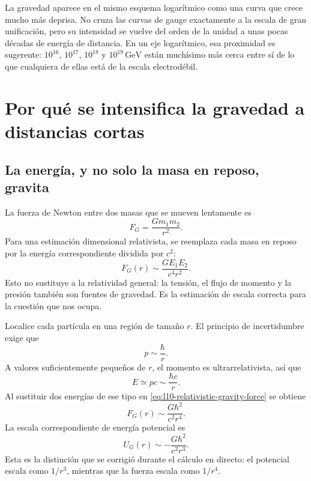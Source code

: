 La gravedad aparece en el mismo esquema logarítmico como una curva que crece mucho más deprisa. No cruza las curvas de gauge exactamente a la escala de gran unificación, pero su intensidad se vuelve del orden de la unidad a unas pocas décadas de energía de distancia. En un eje logarítmico, esa proximidad es sugerente: \(10^{16}\), \(10^{17}\), \(10^{18}\) y \(10^{19}\,\mathrm{GeV}\) están muchísimo más cerca entre sí de lo que cualquiera de ellas está de la escala electrodébil.

\section{Por qué se intensifica la gravedad a distancias cortas}

\subsection{La energía, y no solo la masa en reposo, gravita}

La fuerza de Newton entre dos masas que se mueven lentamente es
\begin{equation}
  F_G=\frac{Gm_1m_2}{r^2}.
  \label{eq:l10-newton-force}
\end{equation}
Para una estimación dimensional relativista, se reemplaza cada masa en reposo por la energía correspondiente dividida por \(c^2\):
\begin{equation}
  F_G(r)\sim\frac{GE_1E_2}{c^4r^2}.
  \label{eq:l10-relativistic-gravity-force}
\end{equation}
Esto no sustituye a la relatividad general: la tensión, el flujo de momento y la presión también son fuentes de gravedad. Es la estimación de escala correcta para la cuestión que nos ocupa.

Localice cada partícula en una región de tamaño \(r\). El principio de incertidumbre exige que
\begin{equation}
  p\sim\frac{\hbar}{r}.
  \label{eq:l10-localization-momentum}
\end{equation}
A valores suficientemente pequeños de \(r\), el momento es ultrarrelativista, así que
\begin{equation}
  E\simeq pc\sim\frac{\hbar c}{r}.
  \label{eq:l10-localization-energy}
\end{equation}
Al sustituir dos energías de ese tipo en \eqref{eq:l10-relativistic-gravity-force} se obtiene
\begin{equation}
  F_G(r)
  \sim
  \frac{G\hbar^2}{c^2r^4}.
  \label{eq:l10-short-distance-gravity-force}
\end{equation}
La escala correspondiente de energía potencial es
\begin{equation}
  U_G(r)\sim-\frac{G\hbar^2}{c^2r^3}.
  \label{eq:l10-short-distance-gravity-potential}
\end{equation}
Esta es la distinción que se corrigió durante el cálculo en directo: el potencial escala como \(1/r^3\), mientras que la fuerza escala como \(1/r^4\).

